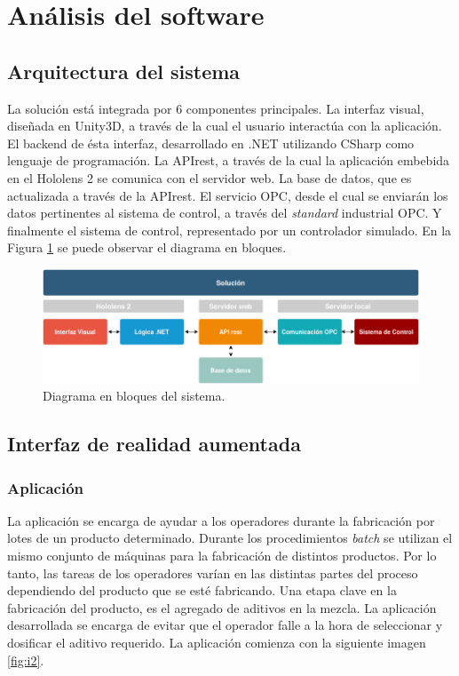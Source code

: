 \section{Análisis del software}

\subsection{Arquitectura del sistema}
La solución está integrada por 6 componentes principales. La interfaz visual, diseñada en Unity3D, a través de la cual el usuario interactúa con la aplicación. El backend de ésta interfaz, desarrollado en .NET utilizando CSharp como lenguaje de programación. La APIrest, a través de la cual la aplicación embebida en el Hololens 2 se comunica con el servidor web. La base de datos, que es actualizada a través de la APIrest. El servicio OPC, desde el cual se enviarán los datos pertinentes al sistema de control, a través del \textit{standard} industrial OPC. Y finalmente el sistema de control, representado por un controlador simulado. En la Figura \ref{fig:Diag_bloques} se puede observar el diagrama en bloques.

\begin{figure}[htpb]
	\centering
	\includegraphics[scale=.5]{./Figures/Diag_bloques.jpg}
	\caption{Diagrama en bloques del sistema\protect\footnotemark.}
	\label{fig:Diag_bloques}
\end{figure}

\subsection{Interfaz de realidad aumentada}
\subsubsection{Aplicación}

La aplicación se encarga de ayudar a los operadores durante la fabricación por lotes de un producto determinado. Durante los procedimientos \textit{batch} se utilizan el mismo conjunto de máquinas para la fabricación de distintos productos. Por lo tanto, las tareas de los operadores varían en las distintas partes del proceso dependiendo del producto que se esté fabricando. Una etapa clave en la fabricación del producto, es el agregado de aditivos en la mezcla. La aplicación desarrollada se encarga de evitar que el operador falle a la hora de seleccionar y dosificar el aditivo requerido. La aplicación comienza con la siguiente imagen \ref{fig:i2}.


